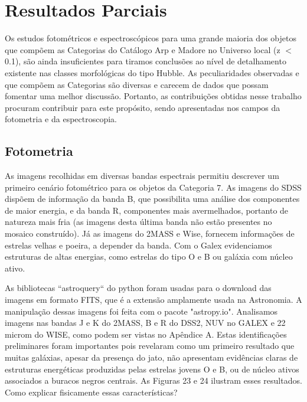 
\chapter{Resultados Parciais}

Os estudos fotométricos e espectroscópicos para uma grande maioria dos objetos que compõem as Categorias do Catálogo Arp e Madore no Universo local (z $<$ 0.1), são ainda insuficientes para tiramos conclusões ao nível de detalhamento existente nas classes morfológicas do tipo Hubble. As peculiaridades observadas e que compõem as Categorias são diversas e carecem de dados que possam fomentar uma melhor discussão. Portanto, as contribuições obtidas nesse trabalho procuram contribuir para este propósito, sendo apresentadas nos campos da fotometria e da espectroscopia.

\section{Fotometria}

As imagens recolhidas em diversas bandas espectrais permitiu descrever um primeiro cenário fotométrico para os objetos da Categoria 7. As imagens do SDSS dispõem de informação da banda B, que possibilita uma análise dos componentes de maior energia, e da banda R, componentes mais avermelhados, portanto de natureza mais fria (as imagens desta última banda não estão presentes no mosaico construído). Já as imagens do 2MASS e Wise, fornecem informações de estrelas velhas e poeira, a depender da banda. Com o Galex evidenciamos estruturas de altas energias, como estrelas do tipo O e B ou
galáxia com núcleo ativo.

As bibliotecas ``astroquery`` do python foram usadas para o download das imagens em formato FITS, que é a extensão amplamente usada na Astronomia. A manipulação dessas imagens foi feita com o pacote "astropy.io". Analisamos imagens nas bandas J e K do 2MASS, B e R do DSS2, NUV no GALEX e 22 microm do WISE, como podem ser vistas no Apêndice A. Estas identificações preliminares foram importantes pois revelaram como um primeiro resultado que muitas galáxias, apesar da presença do jato, não apresentam evidências claras de estruturas energéticas produzidas pelas estrelas jovens O e B, ou de núcleo ativos associados a buracos negros centrais. As Figuras 23 e 24 ilustram esses resultados. Como explicar fisicamente essas características? 

